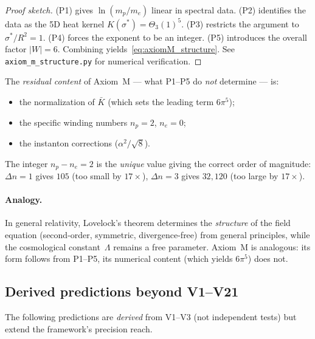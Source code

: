 \begin{proof}[Proof sketch]
(P1) gives $\ln(m_p/m_e)$ linear in spectral data.
(P2) identifies the data as the 5D heat kernel
$K(\sigma^*)=\Theta_3(1)^5$.
(P3) restricts the argument to $\sigma^*/R^2=1$.
(P4) forces the exponent to be an integer.
(P5) introduces the overall factor $|W|=6$.
Combining yields~\eqref{eq:axiomM_structure}.
See \texttt{axiom\_m\_structure.py} for numerical verification.
\end{proof}

The \emph{residual content} of Axiom~M --- what P1--P5 do \emph{not}
determine --- is:
\begin{itemize}[nosep]
\item the normalization of $\bar{K}$ (which sets the leading term $6\pi^5$);
\item the specific winding numbers $n_p=2$, $n_e=0$;
\item the instanton corrections ($\alpha^2/\!\sqrt{8}$).
\end{itemize}
The integer $n_p-n_e=2$ is the \emph{unique} value giving the correct
order of magnitude: $\Delta n=1$ gives $105$ (too small by $17\times$),
$\Delta n=3$ gives $32{,}120$ (too large by $17\times$).

\paragraph{Analogy.}
In general relativity, Lovelock's theorem determines the \emph{structure}
of the field equation (second-order, symmetric, divergence-free) from
general principles, while the cosmological constant~$\Lambda$ remains
a free parameter. Axiom~M is analogous: its form follows from P1--P5,
its numerical content (which yields $6\pi^5$) does not.










\subsection{Derived predictions beyond V1--V21}
\label{sec:derived_predictions}

The following predictions are \emph{derived} from V1--V3 (not
independent tests) but extend the framework's precision reach.

